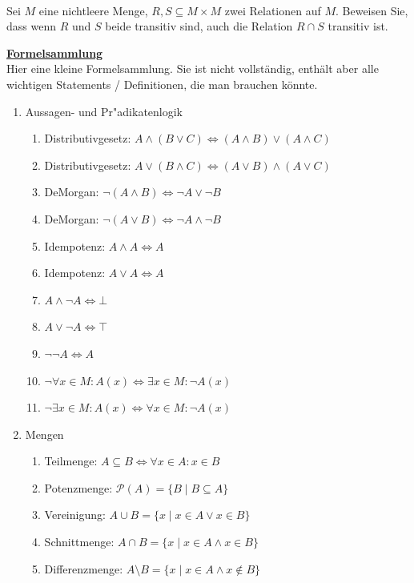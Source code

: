 \\
Sei $M$ eine nichtleere Menge, $R,S\subseteq M\times M$ zwei Relationen auf $M$. Beweisen Sie, dass wenn $R$ und $S$ beide transitiv sind, auch die Relation $R\cap S$ transitiv ist.

\hspace{5cm}
\newpage
\underline{\textbf{Formelsammlung}}\\
Hier eine kleine Formelsammlung. Sie ist nicht vollständig, enthält aber alle wichtigen Statements / Definitionen, die man brauchen könnte.
\begin{enumerate}
\item Aussagen- und Pr"adikatenlogik
\begin{enumerate}
    \item Distributivgesetz: $A\wedge (B \vee C) \Leftrightarrow (A\wedge B) \vee (A\wedge C)$
    \item Distributivgesetz: $A\vee (B \wedge C) \Leftrightarrow (A\vee B) \wedge (A\vee C)$
    \item DeMorgan: $\neg(A\wedge B) \Leftrightarrow \neg A \vee \neg B$
    \item DeMorgan: $\neg(A\vee B) \Leftrightarrow \neg A \wedge \neg B$
    \item Idempotenz: $A\wedge A \Leftrightarrow A$
    \item Idempotenz: $A\vee A \Leftrightarrow A$
    \item $A\wedge \neg A \Leftrightarrow \bot$
    \item $A\vee \neg A \Leftrightarrow \top$
    \item $\neg\neg A \Leftrightarrow A$
    \item $\neg\forall x\in M: A(x) \Leftrightarrow \exists x\in M: \neg A(x)$
    \item $\neg\exists x\in M: A(x) \Leftrightarrow \forall x\in M: \neg A(x)$
\end{enumerate}
\item Mengen
\begin{enumerate}
    \item Teilmenge: $A\subseteq B \Leftrightarrow \forall x\in A: x\in B$
    \item Potenzmenge: $\mathscr{P}(A) = \{B\mid B\subseteq A\}$
    \item Vereinigung: $A\cup B = \{x\mid x\in A \vee x\in B\}$
    \item Schnittmenge: $A\cap B = \{x\mid x\in A \wedge x\in B\}$
    \item Differenzmenge: $A\setminus B = \{x\mid x\in A \wedge x\notin B\}$

\end{enumerate}
\end{enumerate}
